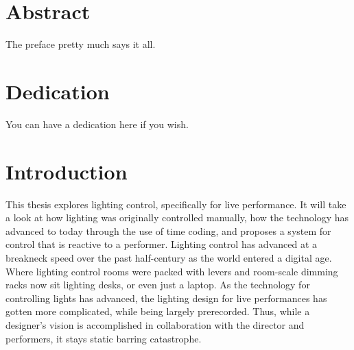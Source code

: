 \documentclass[12pt,twoside]{reedthesis}
\begin{document}
    \tableofcontents
    \listoftables
    \listoffigures

    \chapter*{Abstract}
	The preface pretty much says it all.
	
	\chapter*{Dedication}
	You can have a dedication here if you wish.

  \mainmatter %
  \pagestyle{fancyplain} %


    \chapter*{Introduction}

 \onehalfspacing
	
This thesis explores lighting control, specifically for live performance. It will take a look at how lighting was originally controlled manually, how the technology has advanced to today through the use of time coding, and proposes a system for control that is reactive to a performer. Lighting control has advanced at a breakneck speed over the past half-century as the world entered a digital age. Where lighting control rooms were packed with levers and room-scale dimming racks now sit lighting desks, or even just a laptop. As the technology for controlling lights has advanced, the lighting design for live performances has gotten more complicated, while being largely prerecorded. Thus, while a designer's vision is accomplished in collaboration with the director and performers, it stays static barring catastrophe.
\end{document}
